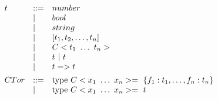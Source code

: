 \begin{center}
$
\begin{array}{lll}
t & \bnfdef & number  \\
  & \bnfalt & bool \\
  & \bnfalt & string \\
  & \bnfalt & [t_1, t_2, \ldots, t_n] \\
  & \bnfalt & C<t_1 ~ \ldots ~ t_n> \\
  & \bnfalt & t~|~t \\
  & \bnfalt & t => t \\[1ex]
  
CTor & \bnfdef & \mbox{type}~C<x_1~\ldots ~x_n>=~ \{f_1:t_1, \ldots, f_n:t_n\} \\ 
  & \bnfalt & \mbox{type}~C<x_1~\ldots ~x_n>=~ t \\
\end{array}
$
\captionsetup{type=lstlisting}
\label{tbl:syntaxjs_types}
\end{center}

\clearpage


